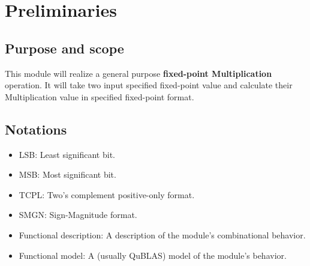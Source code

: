 \documentclass[a4paper, oneside]{report}
\author{Bolin Li}
\date{2024.11.25}
\begin{document}
    \setmainfont{TeX Gyre Heros}
    \maketitle
    \tableofcontents
    \thispagestyle{empty}
    \clearpage
    \pagestyle{fancy}
    \setcounter{page}{1}
    \chapter{Preliminaries}
        \section{Purpose and scope}
        This module will realize a general purpose \textbf{fixed-point Multiplication} operation. It will take two input specified fixed-point value and calculate their Multiplication value in specified fixed-point format.
        \section{Notations}
            \begin{itemize}
                \item LSB: Least significant bit.
                \item MSB: Most significant bit.
                \item TCPL: Two's complement positive-only format.
                \item SMGN: Sign-Magnitude format.
                \item Functional description: A description of the module's combinational behavior.
                \item Functional model: A (usually QuBLAS) model of the module's behavior.
            \end{itemize}
\end{document}
